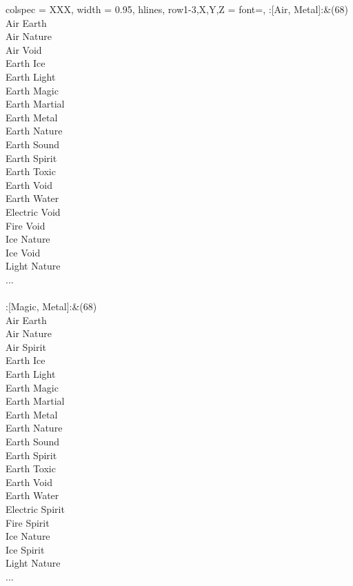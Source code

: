 \begin{longtblr}[
	caption = {2v2 Attacking Effective},
	label = {2v2-Attacking-Effective},
]{
	colspec = {XXX}, width = 0.95\linewidth,
	hlines,
	row{1-3,X,Y,Z} = {font=\bfseries},
}
	:[Air, Metal]:&{(68)\\
	Air Earth \\
	Air Nature \\
	Air Void \\
	Earth Ice \\
	Earth Light \\
	Earth Magic \\
	Earth Martial \\
	Earth Metal \\
	Earth Nature \\
	Earth Sound \\
	Earth Spirit \\
	Earth Toxic \\
	Earth Void \\
	Earth Water \\
	Electric Void \\
	Fire Void \\
	Ice Nature \\
	Ice Void \\
	Light Nature \\
	...\\
	}\\

	:[Magic, Metal]:&{(68)\\
	Air Earth \\
	Air Nature \\
	Air Spirit \\
	Earth Ice \\
	Earth Light \\
	Earth Magic \\
	Earth Martial \\
	Earth Metal \\
	Earth Nature \\
	Earth Sound \\
	Earth Spirit \\
	Earth Toxic \\
	Earth Void \\
	Earth Water \\
	Electric Spirit \\
	Fire Spirit \\
	Ice Nature \\
	Ice Spirit \\
	Light Nature \\
	...\\
	}\\


\end{longtblr}
